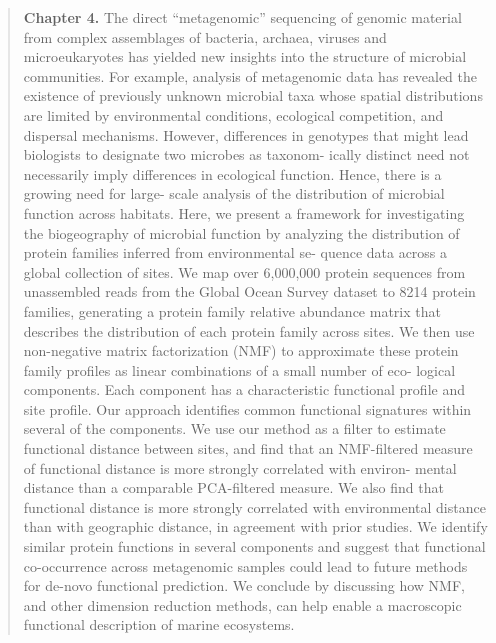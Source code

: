 \begin{quote}
\noindent\textbf{Chapter 4.} The direct ``metagenomic'' sequencing of genomic
material from complex assemblages of bacteria, archaea, viruses and
microeukaryotes has yielded new insights into the structure of microbial
communities. For example, analysis of metagenomic data has revealed the
existence of previously unknown microbial taxa whose spatial distributions are
limited by environmental conditions, ecological competition, and dispersal
mechanisms. However, differences in genotypes that might lead biologists to
designate two microbes as taxonom- ically distinct need not necessarily imply
differences in ecological function. Hence, there is a growing need for large-
scale analysis of the distribution of microbial function across habitats.
Here, we present a framework for investigating the biogeography of microbial
function by analyzing the distribution of protein families inferred from
environmental se- quence data across a global collection of sites. We map over
6,000,000 protein sequences from unassembled reads from the Global Ocean
Survey dataset to 8214 protein families, generating a protein family relative
abundance matrix that describes the distribution of each protein family across
sites. We then use non-negative matrix factorization (NMF) to approximate
these protein family profiles as linear combinations of a small number of eco-
logical components. Each component has a characteristic functional profile and
site profile. Our approach identifies common functional signatures within
several of the components. We use our method as a filter to estimate
functional distance between sites, and find that an NMF-filtered measure of
functional distance is more strongly correlated with environ- mental distance
than a comparable PCA-filtered measure. We also find that functional distance
is more strongly correlated with environmental distance than with geographic
distance, in agreement with prior studies. We identify similar protein
functions in several components and suggest that functional co-occurrence
across metagenomic samples could lead to future methods for de-novo functional
prediction. We conclude by discussing how NMF, and other dimension reduction
methods, can help enable a macroscopic functional description of marine
ecosystems.
\end{quote}

